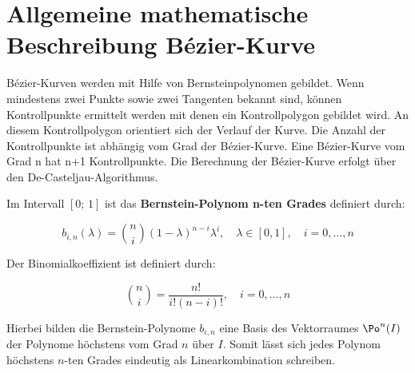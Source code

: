 %
%

\section{Allgemeine mathematische Beschreibung Bézier-Kurve}

Bézier-Kurven werden mit Hilfe von Bernsteinpolynomen gebildet. Wenn mindestens zwei Punkte sowie zwei Tangenten bekannt sind, können Kontrollpunkte ermittelt werden mit denen ein Kontrollpolygon gebildet wird. An diesem Kontrollpolygon  orientiert sich der Verlauf der Kurve. Die Anzahl der  Kontrollpunkte ist abhängig vom Grad der Bézier-Kurve.  Eine Bézier-Kurve vom Grad n hat n+1 Kontrollpunkte.  Die Berechnung der Bézier-Kurve erfolgt über den De-Casteljau-Algorithmus.

\bigskip

\DEF
{
  Im Intervall $[0;\, 1]$ ist das \textbf{ Bernstein-Polynom n-ten Grades}	definiert durch:
	
  \begin{equation}
	b_{i,n}(\lambda) = \binom{n}{i} (1-\lambda)^{n-i} \lambda^{i}, \quad \lambda \in [0,1], \quad i=0,\dots,n
	\label{Bernsteinpolynome}
  \end{equation}
}

\bigskip

\DEF
{
  Der Binomialkoeffizient ist definiert durch:
    
 \begin{equation}
   \binom{n}{i}=\frac{n!}{i!(n-i)!}, \quad i=0, \dots ,n  
   \label{Binomialkoeffizient}
 \end{equation}
}	

\bigskip

Hierbei bilden die Bernstein-Polynome $b_{i,n}$ eine Basis des Vektorraumes $\Po^n(I)$ der Polynome höchstens vom Grad $n$ über $I$. Somit lässt sich jedes Polynom höchstens $n$-ten Grades eindeutig als Linearkombination schreiben.	%
\autocite{Farin:2002}

\bigskip


